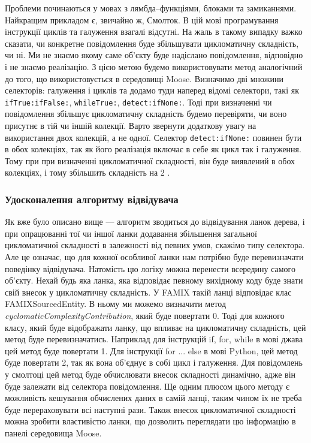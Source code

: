 \documentclass[12pt,a4paper]{article}
\begin{document}
Проблеми починаються у мовах з лямбда--функціями, блоками та замиканнями. Найкращим прикладом є, звичайно ж, Смолток. В цій мові програмування інструкції циклів та галуження взагалі відсутні. На жаль в такому випадку важко сказати, чи конкретне повідомлення буде збільшувати цикломатичну складність, чи ні. Ми не знаємо якому саме об'єкту буде надіслано повідомлення, відповідно і не знаємо реалізацію. З цією метою будемо використовувати метод аналогічний до того, що використовується в середовищі Moose. Визначимо дві множини селекторів: галуження і циклів та додамо туди наперед відомі селектори, такі як \lstinline$ifTrue:ifFalse:$, \lstinline$whileTrue:$, \lstinline$detect:ifNone:$. Тоді при визначенні чи повідомлення збільшує цикломатичну складність будемо перевіряти, чи воно присутнє в тій чи іншій колекції. Варто звернути додаткову увагу на використання двох колекцій, а не одної. Селектор \lstinline$detect:ifNone:$ повинен бути в обох колекціях, так як його реалізація включає в себе як цикл так і галуження. Тому при при визначенні цикломатичної складності, він буде виявлений в обох колекціях, і тому збільшить складність на 2 \cite{cyclocomplexity-moose}.

\subsubsection{Удосконалення алгоритму відвідувача}
Як вже було описано вище --- алгоритм зводиться до відвідування ланок дерева, і при опрацюванні тої чи іншої ланки додавання збільшення загальної цикломатичної складності в залежності від певних умов, скажімо типу селектора. Але це означає, що для кожної особливої ланки нам потрібно буде перевизначати поведінку відвідувача. Натомість цю логіку можна перенести всередину самого об'єкту. Нехай будь яка ланка, яка відповідає певному вихідному коду буде знати свій внесок у цикломатичну складність. У FAMIX такій ланці відповідає клас FAMIXSourcedEntity. В ньому ми можемо визначити метод \emph{cyclomaticComplexityContribution}, який буде повертати 0. Тоді для кожного класу, який буде відображати ланку, що впливає на цикломатичну складність, цей метод буде перевизначатись. Наприклад для інструкцій if, for, while в мові джава цей метод буде повертати 1. Для інструкції for ... else в мові Python, цей метод буде повертати 2, так як вона об'єднує в собі цикл і галуження. Для повідомлень у смолтоці цей метод буде обчислювати внесок складності динамічно, адже він буде залежати від селектора повідомлення. Ще одним плюсом цього методу є можливість кешування обчислених даних в самій ланці, таким чином їх не треба буде перераховувати всі наступні рази. Також внесок цикломатичної складності можна зробити властивістю ланки, що дозволить переглядати цю інформацію в панелі середовища Moose.
\end{document}
